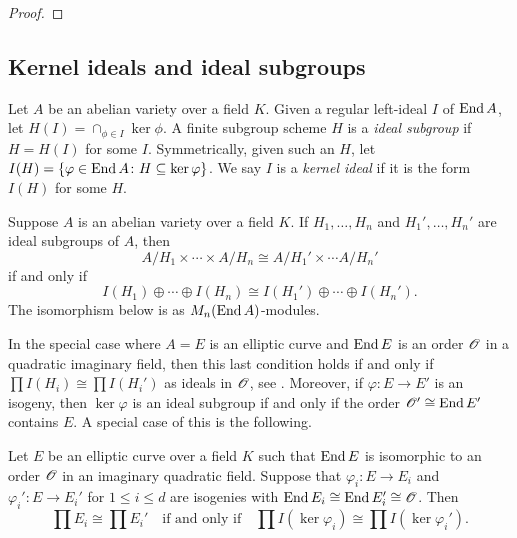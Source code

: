 \documentclass{amsart}
\begin{document}
\begin{proof}
\end{proof}

\subsection{Kernel ideals and ideal subgroups}\label{sec:kani}

\begin{definition}
  Let $A$ be an abelian variety over a field $K$. Given a regular left-ideal $I$ of $\operatorname{End} A$, let $H(I) = \cap_{\phi \in I}\ker \phi$. A finite subgroup scheme $H$ is a \emph{ideal subgroup} if $H = H(I)$ for some $I$. Symmetrically, given such an $H$, let $I(H) = \{\varphi \in \operatorname{End} A \colon H \subseteq \ker\varphi\}$. We say $I$ is a \emph{kernel ideal} if it is the form $I(H)$ for some $H$.
\end{definition}

\begin{theorem}
  Suppose $A$ is an abelian variety over a field $K$. If $H_1,\dots,H_n$ and $H_1',\dots,H_n'$ are ideal subgroups of $A$, then
  \[
    A/H_1 \times \cdots \times A/H_n
    \cong
    A/H_1' \times \cdots A/H_n'
  \]
  if and only if
  \[
    I(H_1) \oplus \cdots \oplus I(H_n)
    \cong
    I(H_1') \oplus \cdots \oplus I(H_n').
  \]
  The isomorphism below is as $M_n(\operatorname{End} A)$-modules.
\end{theorem}

In the special case where $A = E$ is an elliptic curve and $\operatorname{End} E$ is an order $\mathscr{O}$ in a quadratic imaginary field, then this last condition holds if and only if $\prod I(H_i) \cong \prod I(H_i')$ as ideals in $\mathscr{O}$, see \cite[Rem.~49]{kani2011products}. Moreover, if $\varphi: E \to E'$ is an isogeny, then $\ker\varphi$ is an ideal subgroup if and only if the order $\mathscr{O}' \cong \operatorname{End} E'$ contains $E$. A special case of this is the following.

\begin{lemma}\label{lem:prod-idls}
  Let $E$ be an elliptic curve over a field $K$ such that $\operatorname{End} E$ is isomorphic to an order $\mathscr{O}$ in an imaginary quadratic field. Suppose that $\varphi_i: E \to E_i$ and $\varphi_i': E \to E_i'$ for $1 \leq i \leq d$ are isogenies with $\operatorname{End} E_i \cong \operatorname{End} E_i' \cong \mathscr{O}$. Then
  \[
    \prod E_i
    \cong
    \prod E_i'
    \quad\text{if and only if}\quad
    \prod I(\ker\varphi_i)
    \cong
    \prod I(\ker\varphi_i').
  \]
\end{lemma}
\end{document}
